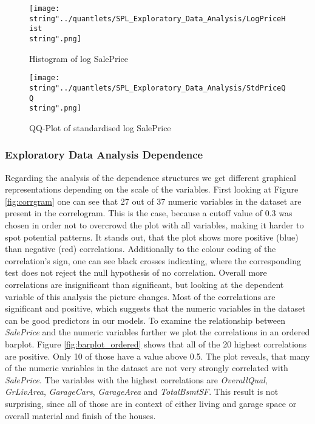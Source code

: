 \begin{figure}[H]
  \centering
\texttt{[image: \\string"../quantlets/SPL\_Exploratory\_Data\_Analysis/LogPriceHist\\string".png]}
  \caption{Histogram of log SalePrice}\label{fig:logpricehist}
\end{figure}

\begin{figure}[H]
  \centering
\texttt{[image: \\string"../quantlets/SPL\_Exploratory\_Data\_Analysis/StdPriceQQ\\string".png]}
  \caption{QQ-Plot of standardised log SalePrice}\label{fig:stdpriceqq}
\end{figure}




\subsubsection{Exploratory Data Analysis Dependence}
Regarding the analysis of the dependence structures we get different graphical representations depending on the scale of the variables. First looking at Figure \ref{fig:corrgram} one can see that 27 out of 37 numeric variables in the dataset are present in the correlogram. This is the case, because a cutoff value of 0.3 was chosen in order not to overcrowd the plot with all variables, making it harder to spot potential patterns. It stands out, that the plot shows more positive (blue) than negative (red) correlations. Additionally to the colour coding of the correlation's sign, one can see black crosses indicating, where the corresponding test does not reject the null hypothesis of no correlation. Overall more correlations are insignificant than significant, but looking at the dependent variable of this analysis the picture changes. Most of the correlations are significant and positive, which suggests that the numeric variables in the dataset can be good predictors in our models. To examine the relationship between \textit{SalePrice} and the numeric variables further we plot the correlations in an ordered barplot. Figure \ref{fig:barplot_ordered} shows that all of the 20 highest correlations are positive. Only 10 of those have a value above 0.5. The plot reveals, that many of the numeric variables in the dataset are not very strongly correlated with \textit{SalePrice}. The variables with the highest correlations are \textit{OverallQual}, \textit{GrLivArea}, \textit{GarageCars}, \textit{GarageArea} and \textit{TotalBsmtSF}. This result is not surprising, since all of those are in context of either living and garage space or overall material and finish of the houses.

